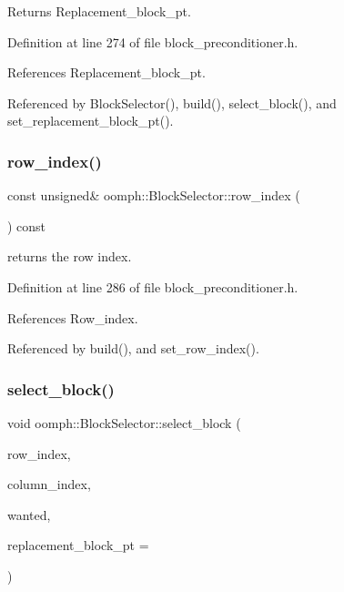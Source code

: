 Returns Replacement\+\_\+block\+\_\+pt. 



Definition at line 274 of file block\+\_\+preconditioner.\+h.



References Replacement\+\_\+block\+\_\+pt.



Referenced by Block\+Selector(), build(), select\+\_\+block(), and set\+\_\+replacement\+\_\+block\+\_\+pt().

\mbox{\label{classoomph_1_1BlockSelector_abc7c527ed8c1080d98bddf2a1f3c1801}} 
\subsubsection{\texorpdfstring{row\+\_\+index()}{row\_index()}}
{\footnotesize\ttfamily const unsigned\& oomph\+::\+Block\+Selector\+::row\+\_\+index (\begin{DoxyParamCaption}{ }\end{DoxyParamCaption}) const\hspace{0.3cm}{\ttfamily [inline]}}



returns the row index. 



Definition at line 286 of file block\+\_\+preconditioner.\+h.



References Row\+\_\+index.



Referenced by build(), and set\+\_\+row\+\_\+index().

\mbox{\label{classoomph_1_1BlockSelector_a62037fdd93cc7b06a781ef4408957d38}} 
\subsubsection{\texorpdfstring{select\+\_\+block()}{select\_block()}}
{\footnotesize\ttfamily void oomph\+::\+Block\+Selector\+::select\+\_\+block (\begin{DoxyParamCaption}\item[{const unsigned \&}]{row\+\_\+index,  }\item[{const unsigned \&}]{column\+\_\+index,  }\item[{const bool \&}]{wanted,  }\item[{\hyperlink{classoomph_1_1CRDoubleMatrix}{C\+R\+Double\+Matrix} $\ast$}]{replacement\+\_\+block\+\_\+pt = {} }\end{DoxyParamCaption})\hspace{0.3cm}{\ttfamily [inline]}}




